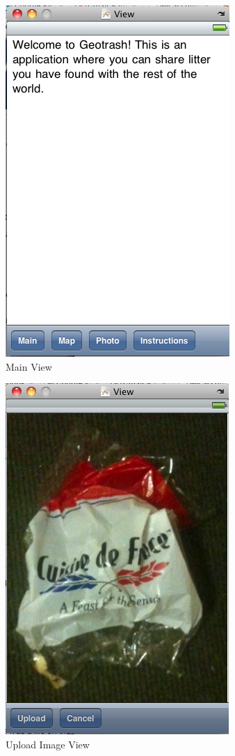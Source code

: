 \documentclass[12pt]{article}
\begin{document}
\begin{figure}[htb]
\begin{center}
\leavevmode
\includegraphics{MainView}
\end{center}
\caption{Main View}
\label{fig:main_view}
\end{figure}

\begin{figure}[htb]
\begin{center}
\leavevmode
\includegraphics{upload}
\end{center}
\caption{Upload Image View}
\label{fig:upload}
\end{figure}
\end{document}
